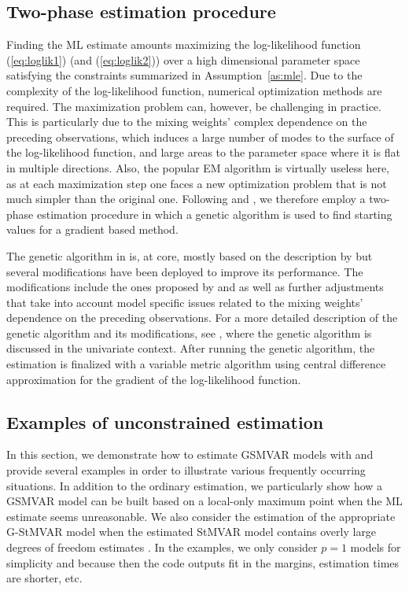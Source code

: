 \documentclass[nojss]{jss} %
\begin{document}
\subsection{Two-phase estimation procedure}\label{sec:estimscheme}
Finding the ML estimate amounts maximizing the log-likelihood function (\ref{eq:loglik1}) (and (\ref{eq:loglik2})) over a high dimensional parameter space satisfying the constraints summarized in Assumption~\ref{as:mle}.  Due to the complexity of the log-likelihood function, numerical optimization methods are required.  The maximization problem can, however, be challenging in practice.  This is particularly due to the mixing weights' complex dependence on the preceding observations,  which induces a large number of modes to the surface of the log-likelihood function, and large areas to the parameter space where it is flat in multiple directions.  Also, the popular EM algorithm \citep{Redner+Walker:1984} is virtually useless here,  as at each maximization step one faces a new optimization problem that is not much simpler than the original one.  Following \cite{Meitz+Preve+Saikkonen2:2018, Meitz+Preve+Saikkonen:2021} and \cite{Virolainen:2021, uGMAR}, we therefore employ a two-phase estimation procedure in which a genetic algorithm is used to find starting values for a gradient based method.

The genetic algorithm in  is, at core, mostly based on the description by \cite{Dorsey+Mayer:1995} but several modifications have been deployed to improve its performance. The modifications include the ones proposed by \cite{Patnaik+Srinivas:1994} and \cite{Smith+Dike+Stegmann:1995} as well as further adjustments that take into account model specific issues related to the mixing weights' dependence on the preceding observations. For a more detailed description of the genetic algorithm and its modifications, see \citet[Appendix A]{Virolainen:2021}, where the genetic algorithm is discussed in the univariate context. After running the genetic algorithm, the estimation is finalized with a variable metric algorithm \cite[algorithm 21, implemented by \citealp{R}]{Nash:1990} using central difference approximation for the gradient of the log-likelihood function.

\subsection{Examples of unconstrained estimation}\label{sec:example_estim}
In this section, we demonstrate how to estimate GSMVAR models with  and provide several examples in order to illustrate various frequently occurring situations. In addition to the ordinary estimation, we particularly show how a GSMVAR model can be built based on a local-only maximum point when the ML estimate seems unreasonable. We also consider the estimation of the appropriate G-StMVAR model when the estimated StMVAR model contains overly large degrees of freedom estimates \citep[see the related discussion in][]{Virolainen2:2021}. In the examples, we only consider $p=1$ models for simplicity and because then the code outputs fit in the margins, estimation times are shorter, etc.
\end{document}
